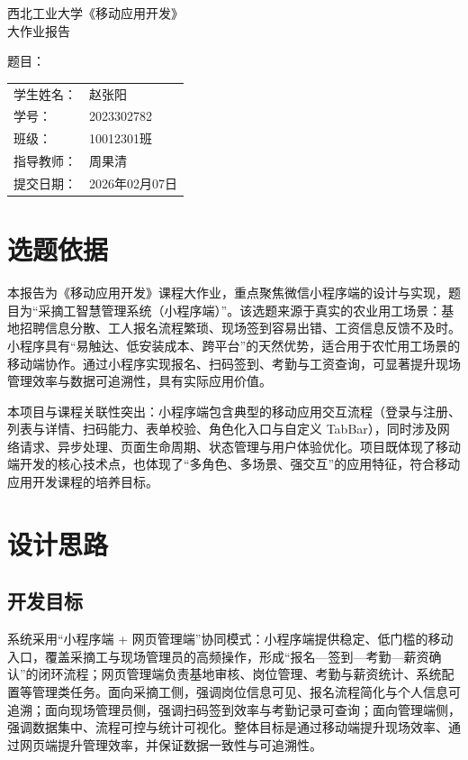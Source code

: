 ﻿\documentclass[UTF8,a4paper]{ctexart}
\begin{document}
\songti{}

\begin{titlepage}
\thispagestyle{empty}

\begin{center}
  \vspace*{2cm}
  {\heiti{} 西北工业大学《移动应用开发》}\\[1.5em]
  {\heiti{} 大作业报告}
\end{center}

\vspace{5cm}

\noindent
题目：

\vspace{2cm}

\noindent
\begin{tabular}{@{}ll}
学生姓名：& 赵张阳\\
学号：& 2023302782\\
班级：& 10012301班\\
指导教师：& 周果清\\
提交日期：& 2026年02月07日
\end{tabular}
\end{titlepage}

\section{选题依据}
本报告为《移动应用开发》课程大作业，重点聚焦微信小程序端的设计与实现，题目为“采摘工智慧管理系统（小程序端）”。该选题来源于真实的农业用工场景：基地招聘信息分散、工人报名流程繁琐、现场签到容易出错、工资信息反馈不及时。小程序具有“易触达、低安装成本、跨平台”的天然优势，适合用于农忙用工场景的移动端协作。通过小程序实现报名、扫码签到、考勤与工资查询，可显著提升现场管理效率与数据可追溯性，具有实际应用价值。

本项目与课程关联性突出：小程序端包含典型的移动应用交互流程（登录与注册、列表与详情、扫码能力、表单校验、角色化入口与自定义 TabBar），同时涉及网络请求、异步处理、页面生命周期、状态管理与用户体验优化。项目既体现了移动端开发的核心技术点，也体现了“多角色、多场景、强交互”的应用特征，符合移动应用开发课程的培养目标。

\section{设计思路}
\subsection{开发目标}
系统采用“小程序端 + 网页管理端”协同模式：小程序端提供稳定、低门槛的移动入口，覆盖采摘工与现场管理员的高频操作，形成“报名—签到—考勤—薪资确认”的闭环流程；网页管理端负责基地审核、岗位管理、考勤与薪资统计、系统配置等管理类任务。面向采摘工侧，强调岗位信息可见、报名流程简化与个人信息可追溯；面向现场管理员侧，强调扫码签到效率与考勤记录可查询；面向管理端侧，强调数据集中、流程可控与统计可视化。整体目标是通过移动端提升现场效率、通过网页端提升管理效率，并保证数据一致性与可追溯性。
\end{document}
